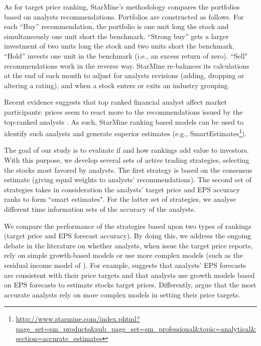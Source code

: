 \documentclass{book}
\begin{document}
As for target price ranking, StarMine's methodology compares the portfolios based on analysts recommendations. Portfolios are constructed as follows. For each ``Buy'' recommendation, the portfolio is one unit long the stock and simultaneously one unit short the benchmark. ``Strong buy'' gets a larger investment of two units long the stock and two units short the benchmark. ``Hold'' invests one unit in the benchmark (i.e., an excess return of zero). ``Sell" recommendations work in the reverse way. StarMine re-balances its calculations at the end of each month to adjust for analysts revisions (adding, dropping or altering a rating), and when a stock enters or exits an industry grouping.


Recent evidence suggests that top ranked financial analyst affect market participants: prices seem to react more to the recommendations issued by the top-ranked analysts \citep{emery2009}. As such, StarMine ranking based models can be used to identify such analysts and generate superior estimates (e.g., SmartEstimates\footnote{\url{http://www.starmine.com/index.phtml?page_set=sm_products&sub_page_set=sm_professional&topic=analytical&section=accurate_estimates}}).



The goal of our study is to evaluate if and how rankings  add value to investors.  With this purpose, we develop several sets of active trading strategies, selecting the stocks most favored by analysts. The first strategy is based on the consensus estimate (giving equal weights to analysts' recommendations). The second set of strategies takes in consideration the analysts' target price and EPS accuracy ranks to form ``smart estimates". For the latter set of strategies, we analyse different time information sets of the accuracy of the analysts.


We compare the performance of the strategies based upon two types of rankings (target price and EPS forecast accuracy). By doing this, we address the ongoing debate in the literature on whether analysts, when issue the target price reports, rely on simple growth-based models or use more complex models (such as the residual income model of \cite{ohlson1995}). For example, \cite{bradshaw2004} suggests that analysts' EPS forecasts are consistent with their price targets and that analysts use growth models based on EPS forecasts to estimate stocks target prices. Differently, \cite{simon2011} argue that the most accurate analysts rely on more complex models in setting their price targets. 
\end{document}

